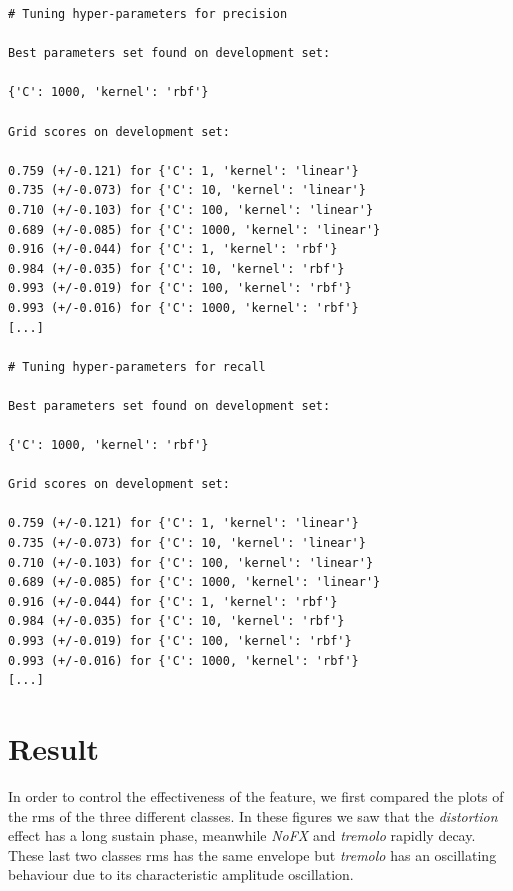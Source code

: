 \documentclass[a4paper,12pt]{report}
\begin{document}
\begin{verbatim}
# Tuning hyper-parameters for precision

Best parameters set found on development set:

{'C': 1000, 'kernel': 'rbf'}

Grid scores on development set:

0.759 (+/-0.121) for {'C': 1, 'kernel': 'linear'}
0.735 (+/-0.073) for {'C': 10, 'kernel': 'linear'}
0.710 (+/-0.103) for {'C': 100, 'kernel': 'linear'}
0.689 (+/-0.085) for {'C': 1000, 'kernel': 'linear'}
0.916 (+/-0.044) for {'C': 1, 'kernel': 'rbf'}
0.984 (+/-0.035) for {'C': 10, 'kernel': 'rbf'}
0.993 (+/-0.019) for {'C': 100, 'kernel': 'rbf'}
0.993 (+/-0.016) for {'C': 1000, 'kernel': 'rbf'}
[...]

# Tuning hyper-parameters for recall

Best parameters set found on development set:

{'C': 1000, 'kernel': 'rbf'}

Grid scores on development set:

0.759 (+/-0.121) for {'C': 1, 'kernel': 'linear'}
0.735 (+/-0.073) for {'C': 10, 'kernel': 'linear'}
0.710 (+/-0.103) for {'C': 100, 'kernel': 'linear'}
0.689 (+/-0.085) for {'C': 1000, 'kernel': 'linear'}
0.916 (+/-0.044) for {'C': 1, 'kernel': 'rbf'}
0.984 (+/-0.035) for {'C': 10, 'kernel': 'rbf'}
0.993 (+/-0.019) for {'C': 100, 'kernel': 'rbf'}
0.993 (+/-0.016) for {'C': 1000, 'kernel': 'rbf'}
[...]
\end{verbatim}
\newpage
\section{Result}

In order to control the effectiveness of the feature, we first compared the plots of the rms of the three different classes. In these figures we saw that the \emph{distortion} effect has a long sustain phase, meanwhile \emph{NoFX} and \emph{tremolo} rapidly decay. These last two classes rms has the same envelope but \emph{tremolo} has an oscillating behaviour due to its characteristic amplitude oscillation.\\
\end{document}
